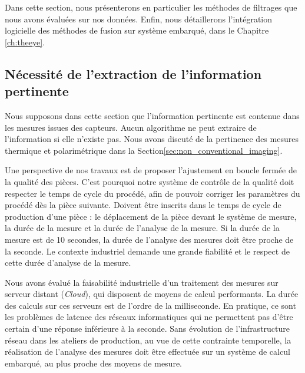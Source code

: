 Dans cette section, nous présenterons en particulier les méthodes de filtrages que nous avons évaluées sur nos données.
Enfin, nous détaillerons l'intégration logicielle des méthodes de fusion sur système embarqué, dans le Chapitre \ref{ch:theeye}.

\subsection{Nécessité de l'extraction de l'information pertinente} \label{subsec:extraction}
Nous supposons dans cette section que l'information pertinente est contenue dans les mesures issues des capteurs.
Aucun algorithme ne peut extraire de l'information si elle n'existe pas.
Nous avons discuté de la pertinence des mesures thermique et polarimétrique dans la Section\ref{sec:non_conventional_imaging}.

Une perspective de nos travaux est de proposer l'ajustement en boucle fermée de la qualité des pièces.
C'est pourquoi notre système de contrôle de la qualité doit respecter le temps de cycle du procédé, afin de pouvoir corriger les paramètres du procédé dès la pièce suivante.
Doivent être inscrits dans le temps de cycle de production d'une pièce : le déplacement de la pièce devant le système de mesure, la durée de la mesure et la durée de l'analyse de la mesure.
Si la durée de la mesure est de 10 secondes, la durée de l'analyse des mesures doit être proche de la seconde.
Le contexte industriel demande une grande fiabilité  et le respect de cette durée d'analyse de la mesure.

Nous avons évalué la faisabilité industrielle d'un traitement des mesures sur serveur distant (\textit{Cloud}), qui disposent de moyens de calcul performants.
La durée des calculs sur ces serveurs est de l'ordre de la milliseconde.
En pratique, ce sont les problèmes de latence des réseaux informatiques qui ne permettent pas d'être certain d'une réponse inférieure à la seconde.
Sans évolution de l'infrastructure réseau dans les ateliers de production, au vue de cette contrainte temporelle, la réalisation de l'analyse des mesures doit être effectuée sur un système de calcul embarqué, au plus proche des moyens de mesure.


